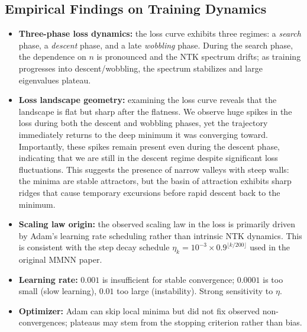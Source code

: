 \documentclass[12pt]{article}
\begin{document}
\subsection{Empirical Findings on Training Dynamics}

\begin{itemize}
    \item \textbf{Three-phase loss dynamics:} the loss curve exhibits three regimes: a \emph{search} phase, a \emph{descent} phase, and a late \emph{wobbling} phase. During the search phase, the dependence on $n$ is pronounced and the NTK spectrum drifts; as training progresses into descent/wobbling, the spectrum stabilizes and large eigenvalues plateau.\\
    
    \item \textbf{Loss landscape geometry:} examining the loss curve reveals that the landscape is flat but sharp after the flatness. We observe huge spikes in the loss during both the descent and wobbling phases, yet the trajectory immediately returns to the deep minimum it was converging toward. Importantly, these spikes remain present even during the descent phase, indicating that we are still in the descent regime despite significant loss fluctuations. This suggests the presence of narrow valleys with steep walls: the minima are stable attractors, but the basin of attraction exhibits sharp ridges that cause temporary excursions before rapid descent back to the minimum.\\
    
    \item \textbf{Scaling law origin:} the observed scaling law in the loss is primarily driven by Adam's learning rate scheduling rather than intrinsic NTK dynamics. This is consistent with the step decay schedule $\eta_k = 10^{-3} \times 0.9^{\lfloor k/200 \rfloor}$ used in the original MMNN paper.\\
    
    \item \textbf{Learning rate:} $0.001$ is insufficient for stable convergence; $0.0001$ is too small (slow learning), $0.01$ too large (instability). Strong sensitivity to $\eta$.\\
    
    \item \textbf{Optimizer:} Adam can skip local minima but did not fix observed non-convergences; plateaus may stem from the stopping criterion rather than bias.\\
    

\end{itemize}
\end{document}
